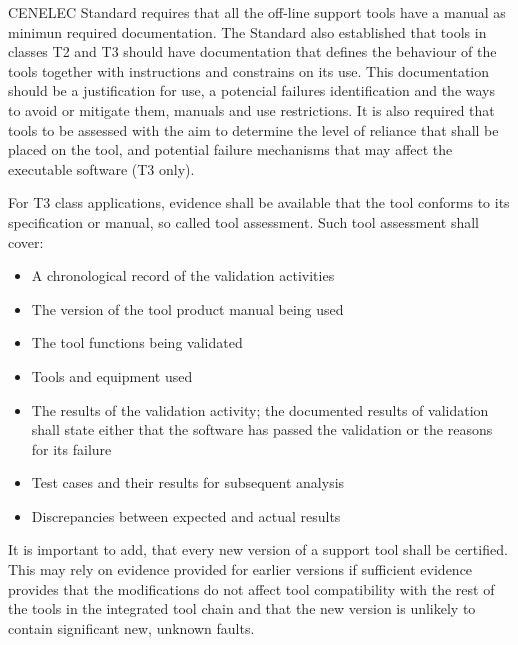 \documentclass{template/openetcs_article}
\begin{document}
CENELEC Standard requires that all the off-line support tools have a manual as  minimun required documentation. The Standard also established that tools in classes T2 and T3 should have documentation that defines the behaviour of the tools together with instructions and constrains on its use. This documentation should be a justification for use, a potencial failures identification and the ways to avoid or mitigate them, manuals and use restrictions. It is also required that tools to be assessed with the aim to determine the level of reliance that shall be placed on the tool, and potential failure mechanisms that may affect the executable software (T3 only).

For T3 class applications, evidence shall be available that the tool conforms to its specification or manual, so called tool assessment. Such tool assessment shall cover:
\begin{itemize}
\item A chronological record of the validation activities
\item The version of the tool product manual being used
\item The tool functions being validated
\item Tools and equipment used
\item The results of the validation activity; the documented results of validation shall state either that the software has passed the validation or the reasons for its failure
\item Test cases and their results for subsequent analysis
\item Discrepancies between expected and actual results
\end{itemize}

It is important to add, that every new version of a support tool shall be certified. This may rely on evidence provided for earlier versions if sufficient evidence provides that the modifications do not affect tool compatibility with the rest of the tools in the integrated tool chain and that the new version is unlikely to contain significant new, unknown faults.
\end{document}
